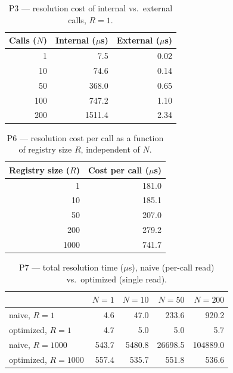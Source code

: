 \begin{table}[htbp]
  \centering
  \caption{P3 --- resolution cost of internal vs.\ external calls, $R{=}1$.}
  \label{tab:eval-p3}
  \begin{tabular}{rrr}
    \hline
    \textbf{Calls ($N$)} & \textbf{Internal (\(\mu\)s)} & \textbf{External (\(\mu\)s)} \\
    \hline
    1   & 7.5    & 0.02 \\
    10  & 74.6   & 0.14 \\
    50  & 368.0  & 0.65 \\
    100 & 747.2  & 1.10 \\
    200 & 1511.4 & 2.34 \\
    \hline
  \end{tabular}
\end{table}

\begin{table}[htbp]
  \centering
  \caption{P6 --- resolution cost per call as a function of registry size $R$, independent of $N$.}
  \label{tab:eval-p6}
  \begin{tabular}{rr}
    \hline
    \textbf{Registry size ($R$)} & \textbf{Cost per call (\(\mu\)s)} \\
    \hline
    1    & 181.0 \\
    10   & 185.1 \\
    50   & 207.0 \\
    200  & 279.2 \\
    1000 & 741.7 \\
    \hline
  \end{tabular}
\end{table}

\begin{table}[htbp]
  \centering
  \caption{P7 --- total resolution time (\(\mu\)s), naive (per-call read) vs.\ optimized (single read).}
  \label{tab:eval-p7}
  \begin{tabular}{lrrrr}
    \hline
     & $N{=}1$ & $N{=}10$ & $N{=}50$ & $N{=}200$ \\
    \hline
    naive, $R{=}1$        & 4.6   & 47.0   & 233.6   & 920.2    \\
    optimized, $R{=}1$    & 4.7   & 5.0    & 5.0     & 5.7      \\
    naive, $R{=}1000$     & 543.7 & 5480.8 & 26698.5 & 104889.0 \\
    optimized, $R{=}1000$ & 557.4 & 535.7  & 551.8   & 536.6    \\
    \hline
  \end{tabular}
\end{table}

